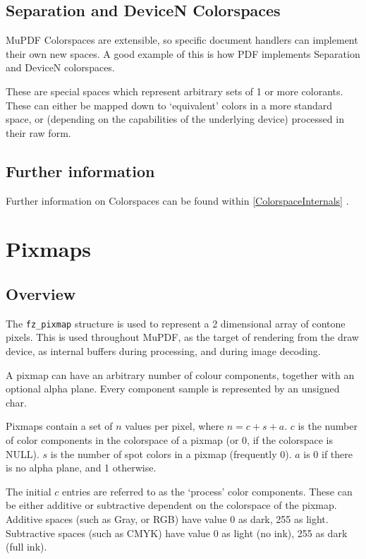 \documentclass[oneside]{book}
\newcommand{\rjwref}[1] {\autoref{#1} \nameref{#1}}
\begin{document}
\subsection{Separation and DeviceN Colorspaces}

MuPDF Colorspaces are extensible, so specific document handlers can implement their own new spaces. A good example of this is how PDF implements Separation and DeviceN colorspaces.

These are special spaces which represent arbitrary sets of 1 or more colorants. These can either be mapped down to `equivalent' colors in a more standard space, or (depending on the capabilities of the underlying device) processed in their raw form.

\subsection{Further information}

Further information on Colorspaces can be found within \rjwref{ColorspaceInternals}.

\section{Pixmaps}
\label{Pixmaps}

\subsection{Overview}

The \texttt{fz\_pixmap} structure is used to represent a 2 dimensional array of contone pixels. This is used throughout MuPDF, as the target of rendering from the draw device, as internal buffers during processing, and during image decoding.

A pixmap can have an arbitrary number of colour components, together with an optional alpha plane. Every component sample is represented by an unsigned char.

Pixmaps contain a set of $n$ values per pixel, where $n = c + s + a$. $c$ is the number of color components in the colorspace of a pixmap (or 0, if the colorspace is NULL). $s$ is the number of spot colors in a pixmap (frequently 0). $a$ is 0 if there is no alpha plane, and 1 otherwise.

The initial $c$ entries are referred to as the `process' color components. These can be either additive or subtractive dependent on the colorspace of the pixmap. Additive spaces (such as Gray, or RGB) have value 0 as dark, 255 as light. Subtractive spaces (such as CMYK) have value 0 as light (no ink), 255 as dark (full ink).
\end{document}
